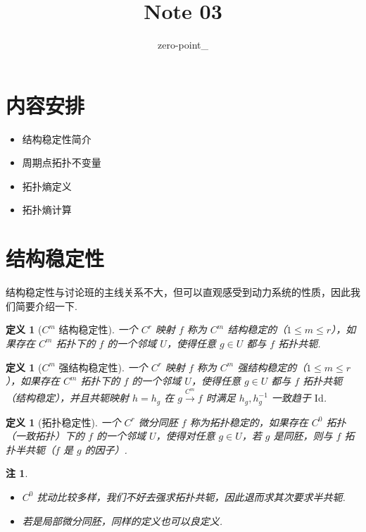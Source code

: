 \documentclass[11pt, a4paper, oneside]{ctexart}
\title{Note 03}
\author{zero-point\_}
\newtheorem{definition}[theorem]{定义}
\newtheorem{remark}[theorem]{注}
\newcommand{\Id}{\mathrm{Id}}
\begin{document}
	\maketitle
    \section{内容安排}
    \begin{itemize}
        \item 结构稳定性简介
        \item 周期点拓扑不变量
        \item 拓扑熵定义
        \item 拓扑熵计算
    \end{itemize}

    \section{结构稳定性}
    结构稳定性与讨论班的主线关系不大，但可以直观感受到动力系统的性质，因此我们简要介绍一下.
    \begin{definition}[$C^m$ 结构稳定性]
        一个 $C^r$ 映射 $f$ 称为 $C^m$ 结构稳定的（$1\leq m\leq r$），如果存在 $C^m$ 拓扑下的 $f$ 的一个邻域 $U$，使得任意 $g\in U$ 都与 $f$ 拓扑共轭.
    \end{definition}
    \begin{definition}[$C^m$ 强结构稳定性]
        一个 $C^r$ 映射 $f$ 称为 $C^m$ 强结构稳定的（$1\leq m\leq r$），如果存在 $C^m$ 拓扑下的 $f$ 的一个邻域 $U$，使得任意 $g\in U$ 都与 $f$ 拓扑共轭（结构稳定），并且共轭映射 $h=h_g$ 在 $g\stackrel{C^m}{\to}f$ 时满足 $h_g,h_g^{-1}$ 一致趋于 $\Id$.
    \end{definition}
    \begin{definition}[拓扑稳定性]
        一个 $C^r$ 微分同胚 $f$ 称为拓扑稳定的，如果存在 $C^0$ 拓扑（一致拓扑）下的 $f$ 的一个邻域 $U$，使得对任意 $g\in U$，若 $g$ 是同胚，则与 $f$ 拓扑半共轭（$f$ 是 $g$ 的因子）.
    \end{definition}
    \begin{remark}
        \begin{itemize}
            \item $C^0$ 扰动比较多样，我们不好去强求拓扑共轭，因此退而求其次要求半共轭.
            \item 若是局部微分同胚，同样的定义也可以良定义.
        \end{itemize}
    \end{remark}
\end{document}
